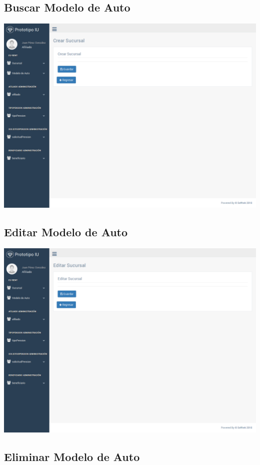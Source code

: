 \documentclass[10pt, letterpaper]{report}
\begin{document}
\subsection{Buscar Modelo de Auto}

\includegraphics[width=\linewidth]{ui-prototype/SucursalServices/CrearSucursalPage.png}

\subsection{Editar Modelo de Auto}

\includegraphics[width=\linewidth]{ui-prototype/SucursalServices/EditarSucursalPage.png}

\subsection{Eliminar Modelo de Auto}
\end{document}

